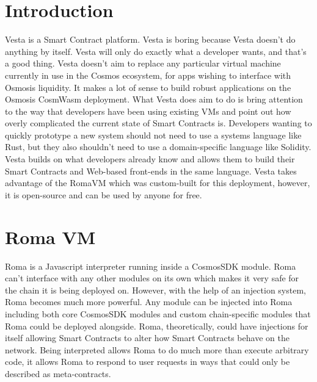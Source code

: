 \documentclass[a4paper]{article}
\begin{document}
\section{Introduction}\label{sec:introduction}
Vesta is a Smart Contract platform.
Vesta is boring because Vesta doesn't do anything by itself.
Vesta will only do exactly what a developer wants, and that's a good thing.
Vesta doesn't aim to replace any particular virtual machine currently in use in the Cosmos ecosystem, for apps wishing to interface with Osmosis liquidity.
It makes a lot of sense to build robust applications on the Osmosis CosmWasm deployment.
What Vesta does aim to do is bring attention to the way that developers have been using existing VMs and point out how overly complicated the current state of Smart Contracts is.
Developers wanting to quickly prototype a new system should not need to use a systems language like Rust, but they also shouldn't need to use a domain-specific language like Solidity.
Vesta builds on what developers already know and allows them to build their Smart Contracts and Web-based front-ends in the same language.
Vesta takes advantage of the RomaVM which was custom-built for this deployment, however, it is open-source and can be used by anyone for free.

\section{Roma VM}\label{sec:roma-vm}
Roma is a Javascript interpreter running inside a CosmosSDK module.
Roma can't interface with any other modules on its own which makes it very safe for the chain it is being deployed on.
However, with the help of an injection system, Roma becomes much more powerful.
Any module can be injected into Roma including both core CosmosSDK modules and custom chain-specific modules that Roma could be deployed alongside.
Roma, theoretically, could have injections for itself allowing Smart Contracts to alter how Smart Contracts behave on the network.
Being interpreted allows Roma to do much more than execute arbitrary code, it allows Roma to respond to user requests in ways that could only be described as meta-contracts.
\end{document}
